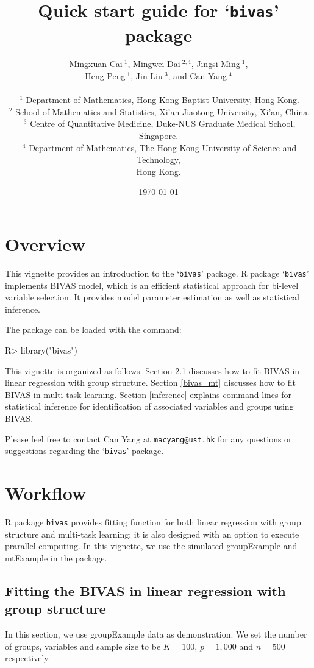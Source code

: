 \documentclass[11pt]{article}
\title{Quick start guide for `\texttt{bivas}' package}
\author{Mingxuan Cai$~^1$, Mingwei Dai$~^{2,4}$, Jingsi Ming$~^1$, \\
Heng Peng$~^1$, Jin Liu$~^3$, and Can Yang$~^4$\\
\\
$~^1$ Department of Mathematics, Hong Kong Baptist University, Hong Kong.\\
$~^2$ School of Mathematics and Statistics, Xi'an Jiaotong University, Xi'an, China.\\
$~^3$ Centre of Quantitative Medicine, Duke-NUS Graduate Medical School, Singapore.\\
$~^4$ Department of Mathematics, The Hong Kong University of Science and Technology,\\
Hong Kong.\\
}
\date{\today}
\begin{document}

\maketitle

\section{Overview}

This vignette provides an introduction to the `\texttt{bivas}' package.
R package `\texttt{bivas}' implements BIVAS model,
which is an efficient statistical approach for bi-level variable selection. It provides model parameter estimation as well as statistical inference.

The package can be loaded with the command:


\begin{Schunk}
\begin{Sinput}
R> library("bivas")
\end{Sinput}
\end{Schunk}

This vignette is organized as follows.
Section \ref{bivas} discusses how to fit BIVAS in linear regression with group structure.
Section \ref{bivas_mt} discusses how to fit BIVAS in multi-task learning.
Section \ref{inference} explains command lines for statistical inference for identification of associated variables and groups using BIVAS.


Please feel free to contact Can Yang at \texttt{macyang@ust.hk} for any questions or suggestions regarding the `\texttt{bivas}' package.

\section{Workflow}\label{workflow}

R package \texttt{bivas} provides fitting function for both linear regression with group structure and multi-task learning;
it is also designed with an option to execute prarallel computing. In this vignette, we use the simulated groupExample and mtExample in the package.

\subsection{Fitting the BIVAS in linear regression with group structure}\label{bivas}

In this section, we use groupExample data as demonstration. We set the number of groups, variables and sample size to be $K=100$, $p=1,000$ and $n=500$ respectively.
\end{document}
